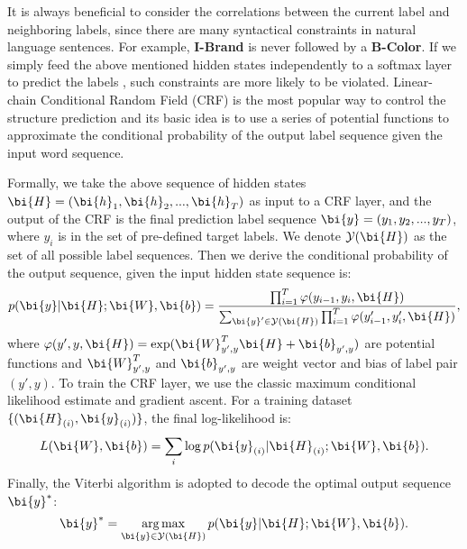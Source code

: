 It is always beneficial to consider the correlations
between the current label and neighboring
labels, since there are many syntactical constraints
in natural language sentences.
For example,
\textbf{I-Brand} is never followed by a \textbf{B-Color}.
If we simply feed the above mentioned hidden states
independently to a softmax layer to predict the labels \cite{hakanni-tur2016multidomain},
such constraints are more likely
to be violated. Linear-chain Conditional Random
Field (CRF) \cite{lafferty2001conditional} 
is the most popular way to control the structure
prediction and its basic idea is to use a series
of potential functions to approximate the conditional
probability of the output label sequence
given the input word sequence.

Formally, we take the above sequence of hidden
states $\bi{H} = (\bi{h}_1, \bi{h}_2, ..., \bi{h}_T)$
as input to a CRF layer,
and the output of the CRF is the final prediction label sequence
$\bi{y} = (y_1, y_2, ..., y_T)$,
where $y_i$ is in the set of pre-defined target labels.
We denote $\mathcal{Y}(\bi{H})$ as the set of all possible label sequences.
Then we derive the conditional probability of the output sequence,
given the input hidden state sequence is:
\begin{equation*}
p(\bi{y}|\bi{H};\bi{W}, \bi{b})=\frac{\prod_{i=1}^{T}\varphi(y_{i-1},y_i,\bi{H})}
{\sum_{\bi{y}'\in\mathcal{Y}(\bi{H})}\prod_{i=1}^{T}\varphi(y'_{i-1},y'_i,\bi{H})},
\end{equation*}
where $\varphi(y',y,\bi{H})=\exp(\bi{W}_{y',y}^{T}\bi{H}+\bi{b}_{y',y})$ are potential functions and $\bi{W}_{y',y}^{T}$ and $\bi{b}_{y',y}$ are weight vector and bias of label pair $(y', y)$.
To train the CRF layer, we use the classic maximum
conditional likelihood estimate and gradient ascent.
For a training dataset $\{(\bi{H}_{(i)}, \bi{y}_{(i)})\}$, 
the final log-likelihood is:
\begin{equation*}
L(\bi{W},\bi{b}) = \sum_{i}\log p(\bi{y}_{(i)}|\bi{H}_{(i)};\bi{W},\bi{b}).
\end{equation*}
Finally, the Viterbi algorithm is adopted
to decode the optimal output sequence $\bi{y}^{*}$:
\begin{equation*}
\bi{y}^{*}=\mathop{\arg\max}_{\bi{y}\in\mathcal{Y}(\bi{H})}p(\bi{y}|\bi{H};\bi{W},\bi{b}).
\end{equation*}

